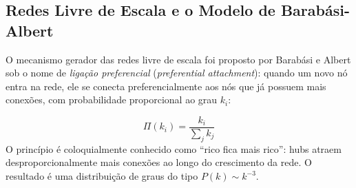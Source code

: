 \subsection{Redes Livre de Escala e o Modelo de Barabási-Albert}

O mecanismo gerador das redes livre de escala foi proposto por Barabási e Albert
sob o nome de \emph{ligação preferencial} (\textit{preferential attachment}): quando
um novo nó entra na rede, ele se conecta preferencialmente aos nós que já possuem
mais conexões, com probabilidade proporcional ao grau $k_i$:

\begin{equation}
\Pi(k_i) = \frac{k_i}{\sum_j k_j}
\end{equation}
O princípio é coloquialmente conhecido como ``rico fica mais rico'': hubs atraem
desproporcionalmente mais conexões ao longo do crescimento da rede. O resultado é
uma distribuição de graus do tipo $P(k) \sim k^{-3}$.

